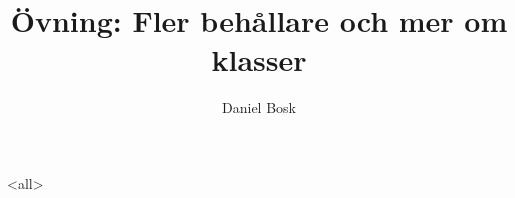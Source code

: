 \documentclass[ignoreframetext]{beamer}
\begin{document}
\title{%
  Övning: Fler behållare och mer om klasser
}
\author{Daniel Bosk}

\begin{frame}
  \maketitle
\end{frame}

\mode<all>

\mode*
%
\end{document}
